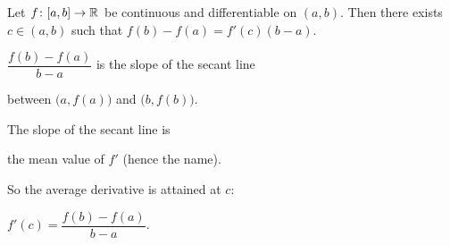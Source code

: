 \documentclass[10pt,aspectratio=169]{beamer}
\begin{document}
\begin{frame}

\begin{theorem}
Let $f \colon [a,b] \to {\mathbb{R}}$ be continuous and
differentiable on $(a,b)$.  Then there exists $c \in (a,b)$
such that \quad
$f(b)-f(a) = f'(c)(b-a)$.
\end{theorem}

\pause
\hspace*{\fill}

\vspace*{-1.5in}

\pause
$\dfrac{f(b)-f(a)}{b-a}$
is the slope of the secant line

between $\bigl(a,f(a)\bigr)$ and $\bigl(b,f(b)\bigr)$.

\pause
\medskip

The slope of the secant line is

the mean value of $f'$ (hence the name).

\pause
\medskip

So the average derivative is attained at $c$:

\medskip

$f'(c)=\dfrac{f(b)-f(a)}{b-a}$.
\end{frame}
\end{document}
